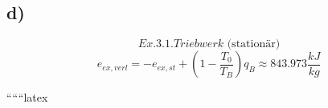 

\subsection*{d)}
\[
Ex. 3.1. Triebwerk \text{ (stationär)}
\]
\[
e_{ex,verl} = -e_{ex,st} + \left( 1 - \frac{T_0}{T_B} \right) q_B \approx 843.973 \frac{kJ}{kg}
\]

``````latex